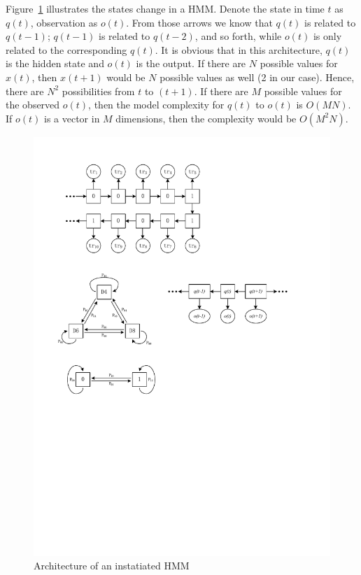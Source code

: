 \documentclass[conference]{IEEEtran}
\begin{document}
Figure~\ref{fig:HMMmodel} illustrates the states change in a HMM. Denote the state in time $t$ as $q(t)$, observation as $o(t)$. From those arrows we know that $q(t)$ is related to $q(t-1)$; $q(t-1)$ is related to $q(t-2)$, and so forth, while $o(t)$ is only related to the corresponding $q(t)$. It is obvious that in this architecture, $q(t)$ is the hidden state and $o(t)$ is the output. If there are $N$ possible values for $x(t)$, then $x(t+1)$ would be $N$ possible values as well (2 in our case). Hence, there are $N^2$ possibilities from $t$ to $(t+1)$. If there are $M$ possible values for the observed $o(t)$, then the model complexity for $q(t)$ to $o(t)$ is $O(MN)$. If $o(t)$ is a vector in $M$ dimensions, then the complexity would be $O(M^2N)$.
\begin{figure}[H]
	\centering
	\includegraphics{HMMmodel.pdf}
	\caption{Architecture of an instatiated HMM}
	\label{fig:HMMmodel}
\end{figure}
\end{document}
